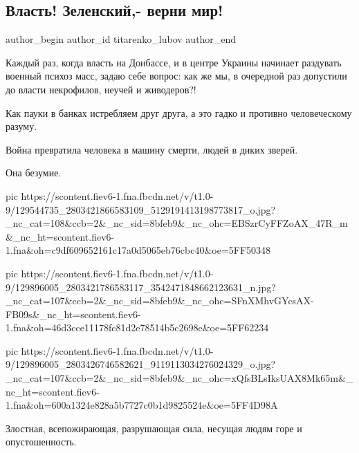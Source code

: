  
 
 
 
 
 
\subsection{Власть! Зеленский,- верни мир!}
\label{sec:07_12_2020.fb.titarenko_lubov.1.verni_mir}
\ifcmt
	author_begin
   author_id titarenko_lubov
	author_end
\fi


Каждый раз, когда власть на Донбассе, и в центре Украины начинает раздувать
военный психоз масс, задаю себе вопрос: как же мы, в очередной раз допустили
до власти некрофилов, неучей  и живодеров?!

Как пауки в банках истребляем друг друга, а это гадко и противно человеческому разуму.

Война превратила человека в машину смерти, людей в диких зверей.  

Она безумие.

\ifcmt
pic https://scontent.fiev6-1.fna.fbcdn.net/v/t1.0-9/129544735_2803421866583109_5129191413198773817_o.jpg?_nc_cat=108&ccb=2&_nc_sid=8bfeb9&_nc_ohc=EBSzrCyFFZoAX_47R_m&_nc_ht=scontent.fiev6-1.fna&oh=c9df609652161c17a0d5065eb76cbc40&oe=5FF50348

pic https://scontent.fiev6-1.fna.fbcdn.net/v/t1.0-9/129896005_2803421786583117_3542471848662123631_n.jpg?_nc_cat=107&ccb=2&_nc_sid=8bfeb9&_nc_ohc=SFnXMhvGYcsAX-FB09s&_nc_ht=scontent.fiev6-1.fna&oh=46d3cce11178fc81d2e78514b5c2698e&oe=5FF62234

pic https://scontent.fiev6-1.fna.fbcdn.net/v/t1.0-9/129896005_2803426746582621_9119113034276024329_o.jpg?_nc_cat=107&ccb=2&_nc_sid=8bfeb9&_nc_ohc=xQfsBLsIksUAX8Mk65m&_nc_ht=scontent.fiev6-1.fna&oh=600a1324e828a5b7727c0b1d9825524e&oe=5FF4D98A
\fi

Злостная, всепожирающая,
разрушающая сила, несущая людям горе и опустошенность.

